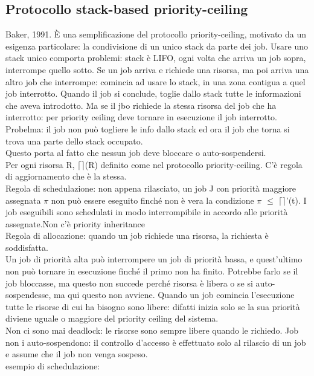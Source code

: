 \documentclass[12pt, oneside]{extbook}
\begin{document}
\subsection{Protocollo stack-based priority-ceiling}
Baker, 1991. È una semplificazione del protocollo priority-ceiling, motivato da un esigenza particolare: la condivisione di un unico stack da parte dei job. Usare uno stack unico comporta problemi: stack è LIFO, ogni volta che arriva un job sopra, interrompe quello sotto. Se un job arriva e richiede una risorsa, ma poi arriva una altro job che interrompe: comincia ad usare lo stack, in una zona contigua a quel job interrotto. Quando il job si conclude, toglie dallo stack tutte le informazioni che aveva introdotto. Ma se il jbo richiede la stessa risorsa del job che ha interrotto: per priority ceiling deve tornare in esecuzione il job interrotto. Probelma: il job non può togliere le info dallo stack ed ora il job che torna si trova una parte dello stack occupato.\\ Questo porta al fatto che nessun job deve bloccare o auto-sospendersi.\\ Per ogni risorsa R, $\lceil\rceil$(R) definito come nel protocollo priority-ceiling. C'è regola di aggiornamento che  è la stessa. \\ Regola di schedulazione: non appena rilasciato, un job J con priorità maggiore assegnata $\pi$ non può essere eseguito finché non è vera la condizione $\pi$ $\leq$ $\lceil\rceil$'(t). I job eseguibili sono schedulati in modo interrompibile in accordo alle priorità assegnate.Non c'è priority inheritance\\ Regola di allocazione: quando un job richiede una risorsa, la richiesta è soddisfatta.\\ Un job di priorità alta può interrompere un job di priorità bassa, e quest'ultimo non può tornare in esecuzione finché il primo non ha finito. Potrebbe farlo se il job bloccasse, ma questo non succede perché risorsa è libera o se si auto-sospendesse, ma qui questo non avviene. Quando un job comincia l'esecuzione tutte le risorse di cui ha bisogno sono libere: difatti inizia solo se la sua priorità diviene uguale o maggiore del priority ceiling del sistema.\\ Non ci sono mai deadlock: le risorse sono sempre libere quando le richiedo. Job non i auto-sospendono: il controllo d'accesso è effettuato solo al rilascio di un job e assume che il job non venga sospeso.\\ esempio di schedulazione:\\
\end{document}
